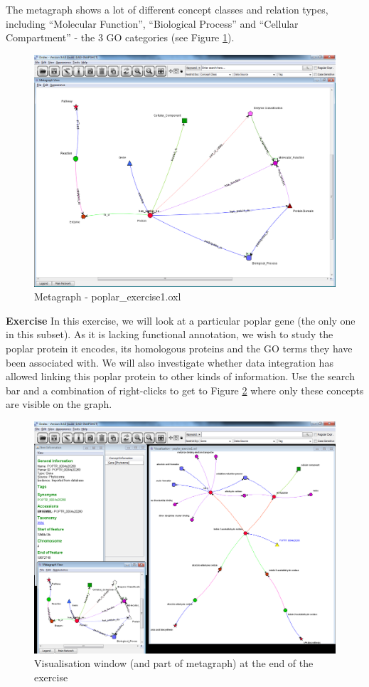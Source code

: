 The metagraph shows a lot of different concept classes and relation types,
including ``Molecular Function'', ``Biological Process'' and ``Cellular Compartment'' - the 3 GO categories (see Figure \ref{fig:vis_poplar_metagraph}).
\begin{figure}[H]
\centering
\includegraphics[scale=0.3]{images/Jun12/poplar_ex1_metagraph.png} 
\caption{Metagraph - poplar\_exercise1.oxl}
\label{fig:vis_poplar_metagraph}
\end{figure}

\exerciserule
\textbf{Exercise}
In this exercise, we will look at a particular poplar gene (the only one in this subset). 
As it is lacking functional annotation, we wish to study the poplar protein it encodes, its homologous proteins 
and the GO terms they have been associated with. We will also investigate whether data integration has allowed linking this poplar protein to other kinds of information.
Use the search bar and a combination of right-clicks to get to Figure \ref{fig:poplar_result_exercise1} where only these concepts are visible on the graph.
\begin{figure}[H]
\centering
\includegraphics[scale=0.3]{images/Jun12/poplar_result_exercise1.png} 
\caption{Visualisation window (and part of metagraph) at the end of the exercise}
\label{fig:poplar_result_exercise1}
\end{figure}

